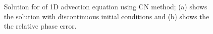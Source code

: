 \begin{figure}[!tbh]
 \centering        
 
     \caption{Solution for of 1D advection equation using CN method; (a) shows the solution with discontinuous initial conditions and (b) shows the the relative phase error.}
   \label{fig:cn}
\end{figure} 